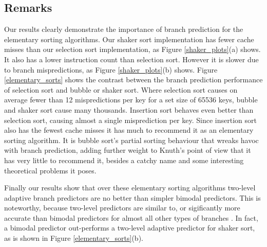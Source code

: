 \documentclass[acmtocl]{acmtrans2m}
\begin{document}
\subsection{Remarks}

Our results clearly demonstrate the importance of branch
prediction for the elementary sorting algorithms. 
Our shaker sort implementation has fewer cache misses than our selection sort implementation, as Figure \ref{shaker_plots}(a) shows. 
It also has a lower instruction count than selection sort. However it is slower due to branch mispredictions, as Figure \ref{shaker_plots}(b) shows.
Figure \ref{elementary_sorts} shows
the contrast between the branch prediction performance of selection sort and bubble or shaker sort. Where
selection sort causes on average fewer than 12 mispredictions per key for a set
size of 65536 keys, bubble and shaker sort cause many thousands.
Insertion sort behaves even better than selection sort, causing
almost a single misprediction per key. Since insertion sort
also has the fewest cache misses it has much to recommend it
as an elementary sorting algorithm. It is bubble sort's
partial sorting behaviour that wreaks havoc with branch prediction,
adding further weight to Knuth's \citeyear{KnuthVol3_98} point of view that it
has very little to recommend it, besides a catchy name and some interesting theoretical problems it
poses. 

Finally our results show that over these elementary sorting algorithms two-level adaptive branch predictors are no
better than simpler bimodal predictors. 
This is noteworthy, because two-level
predictors are similar to, or sigificantly more accurate than bimodal
predictors for almost all other types of branches \cite{Uht+97}.
In fact, a bimodal predictor out-performs a two-level adaptive predictor for shaker sort, as
is shown in Figure \ref{elementary_sorts}(b).
\end{document}
